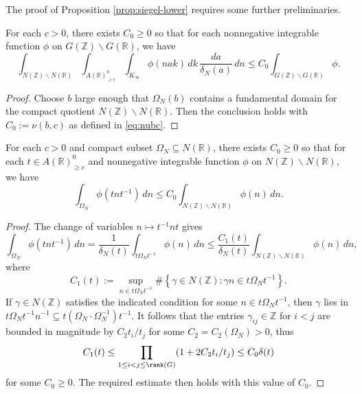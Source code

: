 The proof of Proposition \ref{prop:siegel-lower} requires some further preliminaries.
\begin{lemma}\label{lem:siegel-upper-basic}
  For each $c > 0$, there exists $C_0 \geq 0$ so that for each nonnegative integrable function $\phi$ on $G(\mathbb{Z}) \backslash G(\mathbb{R})$, we have
  \begin{equation*}
    \int_{N(\mathbb{Z}) \backslash N(\mathbb{R})}
    \int_{A(\mathbb{R})^0_{\geq c}}
    \int_{K_\infty}
    \phi(n a k) \, d k \, \frac{d a}{\delta_N(a)} \, d n
    \leq C_0 \int_{G(\mathbb{Z}) \backslash G(\mathbb{R})} \phi.
  \end{equation*}
\end{lemma}
\begin{proof}
  Choose $b$ large enough that $\Omega_N(b)$ contains a fundamental domain for the compact quotient $N(\mathbb{Z}) \backslash N(\mathbb{R})$.  Then the conclusion holds with $C_0 := \nu(b,c)$ as defined in \eqref{eq:nubc}.
\end{proof}

\begin{lemma}\label{lem:scratch-research:each-c-Omega-N}
  For each $c > 0$ and compact subset $\Omega_N \subseteq N(\mathbb{R})$, there exists $C_0 \geq 0$ so that for each $t \in A(\mathbb{R})^0_{\geq c}$ and nonnegative integrable function $\phi$ on $N(\mathbb{Z}) \backslash N(\mathbb{R})$, we have
  \begin{equation*}
    \int_{\Omega_N}
    \phi(t n t^{-1}) \, d n \leq C_0 \int_{N(\mathbb{Z}) \backslash N(\mathbb{R})} \phi(n) \, d n.
  \end{equation*}
\end{lemma}
\begin{proof}
  The change of variables $n \mapsto t^{-1} n t$ gives
  \begin{equation*}
    \int_{\Omega_N}
    \phi(t n t^{-1}) \, d n
    =
    \frac{1}{\delta_N(t)}
    \int_{t \Omega_N t^{-1}}
    \phi(n) \, d n
    \leq
    \frac{C_1(t)}{\delta_N(t)} \int_{N(\mathbb{Z}) \backslash N(\mathbb{R}) }\phi(n) \, d n,
  \end{equation*}
  where
  \begin{equation*}
    C_1(t) := \sup_{n \in t \Omega_N t^{-1}}
    \# \left\{ \gamma \in N(\mathbb{Z}) : \gamma n \in t \Omega_N t^{-1} \right\}.
  \end{equation*}
  If $\gamma \in N(\mathbb{Z})$ satisfies the indicated condition for some $n \in t \Omega_N t^{-1}$, then $\gamma$ lies in $t \Omega_N t^{-1} n^{-1} \subseteq t(\Omega_N \cdot \Omega_N^{-1}) t^{-1}$.  It follows that the entries $\gamma_{i j} \in \mathbb{Z}$ for $i < j$ are bounded in magnitude by $C_2 t_i / t_j$ for some $C_2 = C_2(\Omega_N) > 0$, thus
  \begin{equation*}
    C_1(t) \leq \prod_{1 \leq i < j \leq \rank(G)} (1 + 2 C_2 t_i / t_j) \leq C_0 \delta(t)
  \end{equation*}
  for some $C_0 \geq 0$.  The required estimate then holds with this value of $C_0$.
\end{proof}

